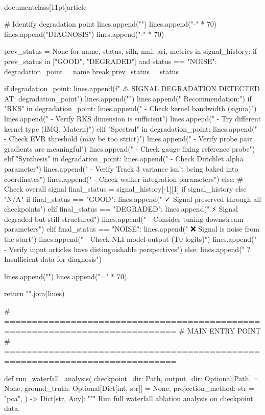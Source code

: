 \\documentclass[11pt]{article}
\begin{document}
\begin{CodeBlock}
    # Identify degradation point
    lines.append("")
    lines.append("-" * 70)
    lines.append("DIAGNOSIS")
    lines.append("-" * 70)

    prev_status = None
    for name, status, silh, nmi, ari, metrics in signal_history:
        if prev_status in ["GOOD", "DEGRADED"] and status == "NOISE":
            degradation_point = name
            break
        prev_status = status

    if degradation_point:
        lines.append(f"  ⚠️  SIGNAL DEGRADATION DETECTED AT: {degradation_point}")
        lines.append("")
        lines.append("  Recommendation:")
        if "RKS" in degradation_point:
            lines.append("    - Check kernel bandwidth (sigma)")
            lines.append("    - Verify RKS dimension is sufficient")
            lines.append("    - Try different kernel type (IMQ, Matern)")
        elif "Spectral" in degradation_point:
            lines.append("    - Check EVR threshold (may be too strict)")
            lines.append("    - Verify probe pair gradients are meaningful")
            lines.append("    - Check gauge fixing reference probe")
        elif "Synthesis" in degradation_point:
            lines.append("    - Check Dirichlet alpha parameter")
            lines.append("    - Verify Track 3 variance isn't being baked into coordinates")
            lines.append("    - Check walker integration parameters")
    else:
        # Check overall signal
        final_status = signal_history[-1][1] if signal_history else "N/A"
        if final_status == "GOOD":
            lines.append("  ✓ Signal preserved through all checkpoints")
        elif final_status == "DEGRADED":
            lines.append("  ⚡ Signal degraded but still structured")
            lines.append("    - Consider tuning downstream parameters")
        elif final_status == "NOISE":
            lines.append("  ❌ Signal is noise from the start")
            lines.append("    - Check NLI model output (T0 logits)")
            lines.append("    - Verify input articles have distinguishable perspectives")
        else:
            lines.append("  ? Insufficient data for diagnosis")

    lines.append("")
    lines.append("=" * 70)

    return "\n".join(lines)


# =============================================================================
# MAIN ENTRY POINT
# =============================================================================

def run_waterfall_analysis(
    checkpoint_dir: Path,
    output_dir: Optional[Path] = None,
    ground_truth: Optional[Dict[int, str]] = None,
    projection_method: str = "pca",
) -> Dict[str, Any]:
    """
    Run full waterfall ablation analysis on checkpoint data.


\end{CodeBlock}
\end{document}
